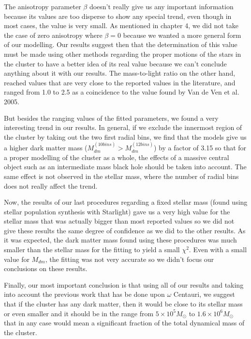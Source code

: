 The anisotropy parameter $\beta$ doesn't really give us any important information because its values are too disperse to show any special trend, even though in most cases, the value is very small. As mentioned in chapter 4, we did not take the case of zero anisotropy where $\beta = 0$ because we wanted a more general form of our modelling. Our results suggest then that the determination of this value must be made using other methods regarding the proper motions of the stars in the cluster to have a better idea of its real value because we can't conclude anything about it with our results. The mass-to-light ratio on the other hand, reached values that are very close to the reported values in the literature, and ranged from 1.0 to 2.5 as a coincidence to the value found by Van de Ven et al. 2005.

But besides the ranging values of the fitted parameters, we found a very interesting trend in our results. In general, if we exclude the innermost region of the cluster by taking out the two first radial bins, we find that the models give us a higher dark matter mass ($M_{dm}^{(10 bins)}>M_{dm}^{(12 bins)}$) by a factor of 3.15 so that for a proper modelling of the cluster as a whole, the effects of a massive central object such as an intermediate mass black hole should be taken into account. The same effect is not observed in the stellar mass, where the number of radial bins does not really affect the trend.

Now, the results of our last procedures regarding a fixed stellar mass (found using stellar population synthesis with Starlight) gave us a very high value for the stellar mass that was actually bigger than most reported values so we did not give these results the same degree of confidence as we did to the other results. As it was expected, the dark matter mass found using these procedures was much smaller than the stellar mass for the fitting to yield a small $\chi^{2}$. Even with a small value for $M_{dm}$, the fitting was not very accurate so we didn't focus our conclusions on these results.

Finally, our most important conclusion is that using all of our results and taking into account the previous work that has be done upon $\omega$ Centauri, we suggest that if the cluster has any dark matter, then it would be close to its stellar mass or even smaller and it should be in the range from $5 \times 10^{5} M_{\odot}$ to $1.6 \times 10^{6} M_{\odot}$ that in any case would mean a significant fraction of the total dynamical mass of the cluster. 

